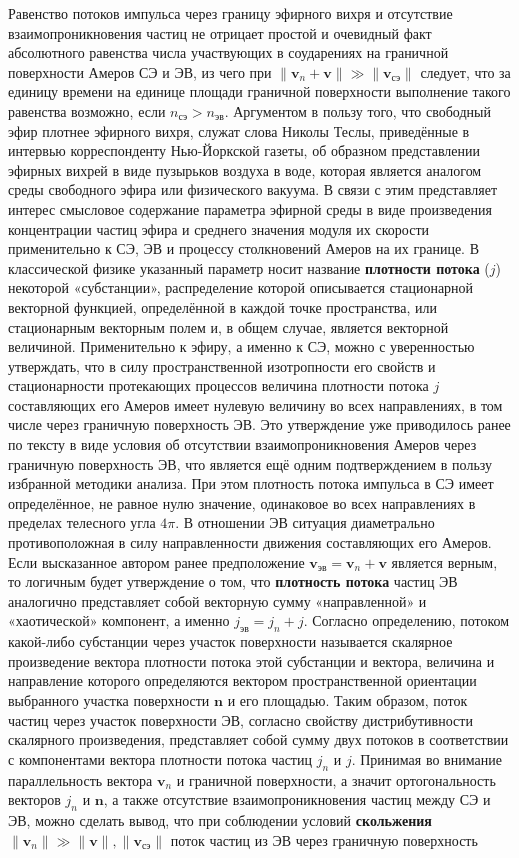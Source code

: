 Равенство потоков импульса через границу эфирного вихря и отсутствие взаимопроникновения частиц не отрицает простой и очевидный факт абсолютного равенства числа участвующих в соударениях на граничной поверхности Амеров СЭ и ЭВ, из чего при \(\|\mathbf{v}_n + \mathbf{v}\| \gg \|\mathbf{v}_{\text{сэ}}\|\) следует, что за единицу времени на единице площади граничной поверхности выполнение такого равенства возможно, если \(n_{\text{сэ}} > n_{\text{эв}}\). Аргументом в пользу того, что свободный эфир плотнее эфирного вихря, служат слова Николы Теслы, приведённые в интервью корреспонденту Нью-Йоркской газеты, об образном представлении эфирных вихрей в виде пузырьков воздуха в воде, которая является аналогом среды свободного эфира или физического вакуума. В связи с этим представляет интерес смысловое содержание параметра эфирной среды в виде произведения концентрации частиц эфира и среднего значения модуля их скорости применительно к СЭ, ЭВ и процессу столкновений Амеров на их границе. В классической физике указанный параметр носит название \textbf{плотности потока} (\(j\)) некоторой «субстанции», распределение которой описывается стационарной векторной функцией, определённой в каждой точке пространства, или стационарным векторным полем и, в общем случае, является векторной величиной. Применительно к эфиру, а именно к СЭ, можно с уверенностью утверждать, что в силу пространственной изотропности его свойств и стационарности протекающих процессов величина плотности потока \(j\) составляющих его Амеров имеет нулевую величину во всех направлениях, в том числе через граничную поверхность ЭВ. Это утверждение уже приводилось ранее по тексту в виде условия об отсутствии взаимопроникновения Амеров через граничную поверхность ЭВ, что является ещё одним подтверждением в пользу избранной методики анализа. При этом плотность потока импульса в СЭ имеет определённое, не равное нулю значение, одинаковое во всех направлениях в пределах телесного угла \(4\pi\). В отношении ЭВ ситуация диаметрально противоположная в силу направленности движения составляющих его Амеров. Если высказанное автором ранее предположение \(\mathbf{v}_{\text{эв}} = \mathbf{v}_n + \mathbf{v}\) является верным, то логичным будет утверждение о том, что \textbf{плотность потока} частиц ЭВ аналогично представляет собой векторную сумму «направленной» и «хаотической» компонент, а именно \(j_{\text{эв}} = j_n + j\). Согласно определению, потоком какой-либо субстанции через участок поверхности называется скалярное произведение вектора плотности потока этой субстанции и вектора, величина и направление которого определяются вектором пространственной ориентации выбранного участка поверхности \(\mathbf{n}\) и его площадью. Таким образом, поток частиц через участок поверхности ЭВ, согласно свойству дистрибутивности скалярного произведения, представляет собой сумму двух потоков в соответствии с компонентами вектора плотности потока частиц \(j_n\) и \(j\). Принимая во внимание параллельность вектора \(\mathbf{v}_n\) и граничной поверхности, а значит ортогональность векторов \(j_n\) и \(\mathbf{n}\), а также отсутствие взаимопроникновения частиц между СЭ и ЭВ, можно сделать вывод, что при соблюдении условий \textbf{скольжения} \(\|\mathbf{v}_n\| \gg \|\mathbf{v}\|, \|\mathbf{v}_{\text{сэ}}\|\) поток частиц из ЭВ через граничную поверхность 